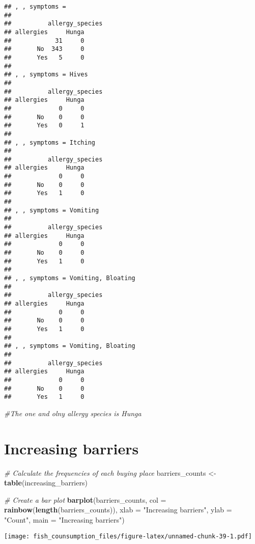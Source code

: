 \documentclass[
]{article}
\newenvironment{Shaded}{\begin{snugshade}}{\end{snugshade}}
\newcommand{\AttributeTok}[1]{\textcolor[rgb]{0.13,0.29,0.53}{#1}}
\newcommand{\CommentTok}[1]{\textcolor[rgb]{0.56,0.35,0.01}{\textit{#1}}}
\newcommand{\FunctionTok}[1]{\textcolor[rgb]{0.13,0.29,0.53}{\textbf{#1}}}
\newcommand{\NormalTok}[1]{#1}
\newcommand{\OtherTok}[1]{\textcolor[rgb]{0.56,0.35,0.01}{#1}}
\newcommand{\StringTok}[1]{\textcolor[rgb]{0.31,0.60,0.02}{#1}}
\begin{document}
\begin{verbatim}
## , , symptoms = 
## 
##          allergy_species
## allergies     Hunga
##            31     0
##       No  343     0
##       Yes   5     0
## 
## , , symptoms = Hives
## 
##          allergy_species
## allergies     Hunga
##             0     0
##       No    0     0
##       Yes   0     1
## 
## , , symptoms = Itching
## 
##          allergy_species
## allergies     Hunga
##             0     0
##       No    0     0
##       Yes   1     0
## 
## , , symptoms = Vomiting
## 
##          allergy_species
## allergies     Hunga
##             0     0
##       No    0     0
##       Yes   1     0
## 
## , , symptoms = Vomiting, Bloating
## 
##          allergy_species
## allergies     Hunga
##             0     0
##       No    0     0
##       Yes   1     0
## 
## , , symptoms = Vomiting, Bloating 
## 
##          allergy_species
## allergies     Hunga
##             0     0
##       No    0     0
##       Yes   1     0
\end{verbatim}

\begin{Shaded}
\begin{Highlighting}[]
\CommentTok{\#The one and olny allergy species is Hunga}
\end{Highlighting}
\end{Shaded}

\hypertarget{increasing-barriers}{%
\section{Increasing barriers}\label{increasing-barriers}}

\begin{Shaded}
\begin{Highlighting}[]
\CommentTok{\# Calculate the frequencies of each buying place}
\NormalTok{barriers\_counts }\OtherTok{\textless{}{-}} \FunctionTok{table}\NormalTok{(increasing\_barriers)}

\CommentTok{\# Create a bar plot}
\FunctionTok{barplot}\NormalTok{(barriers\_counts, }\AttributeTok{col =} \FunctionTok{rainbow}\NormalTok{(}\FunctionTok{length}\NormalTok{(barriers\_counts)), }
        \AttributeTok{xlab =} \StringTok{"Increasing barriers"}\NormalTok{, }\AttributeTok{ylab =} \StringTok{"Count"}\NormalTok{, }\AttributeTok{main =} \StringTok{"Increasing barriers"}\NormalTok{)}
\end{Highlighting}
\end{Shaded}

\texttt{[image: fish\_counsumption\_files/figure-latex/unnamed-chunk-39-1.pdf]}
\end{document}
